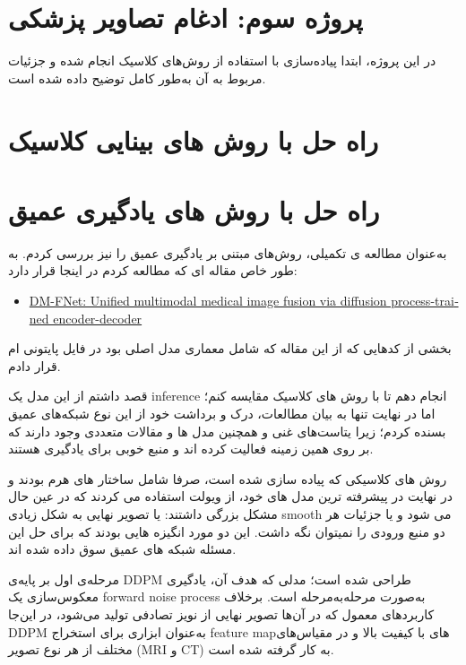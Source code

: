 \documentclass[a4paper,12pt]{article}
\begin{document}
\pagebreak


\section{پروژه سوم: ادغام تصاویر پزشکی}
در این پروژه، ابتدا پیاده‌سازی با استفاده از روش‌های کلاسیک انجام شده و جزئیات مربوط به آن به‌طور کامل توضیح داده شده است. 

\section*{راه حل با روش های بینایی کلاسیک}



\section*{راه حل با روش های یادگیری عمیق}

به‌عنوان مطالعه ی تکمیلی، روش‌های مبتنی بر یادگیری عمیق را نیز بررسی کردم. به طور خاص مقاله ای که مطالعه کردم در اینجا قرار دارد:

\begin{latin}
\begin{itemize}
\item \href{https://arxiv.org/html/2506.15218v1}{DM-FNet: Unified multimodal medical image fusion via diffusion process-trained encoder-decoder}
\end{itemize}
\end{latin}

بخشی از کدهایی که از این مقاله که شامل معماری مدل اصلی بود در فایل پایتونی ام قرار دادم.


 قصد داشتم از این مدل یک inference انجام دهم تا با روش های کلاسیک مقایسه کنم؛ اما در نهایت تنها به بیان مطالعات، درک و برداشت خود از این نوع شبکه‌های عمیق بسنده کردم؛ زیرا  یتاست‌های غنی و همچنین مدل‌ ها و مقالات متعددی وجود دارند که بر روی همین زمینه فعالیت کرده اند و منبع خوبی برای یادگیری هستند. 
 
 روش های کلاسیکی که پیاده سازی شده است، صرفا شامل ساختار های هرم بودند و در نهایت در پیشرفته ترین مدل های خود، از ویولت استفاده می کردند که در عین حال مشکل بزرگی داشتند:
 یا تصویر نهایی به شکل زیادی smooth می شود و یا جزئیات هر دو منبع ورودی را نمیتوان نگه داشت.
 این دو مورد انگیزه هایی بودند که برای حل این مسئله شبکه های عمیق سوق داده شده اند.
 
 
 مرحله‌ی اول بر پایه‌ی DDPM طراحی شده است؛ مدلی که هدف آن، یادگیری معکوس‌سازی یک forward noise process به‌صورت مرحله‌به‌مرحله است. برخلاف کاربردهای معمول که در آن‌ها تصویر نهایی از نویز تصادفی تولید می‌شود، در این‌جا DDPM به‌عنوان ابزاری برای استخراج feature map‌های با کیفیت بالا و در مقیاس‌های مختلف از هر نوع تصویر (MRI و CT) به کار گرفته شده است.
 
\end{document}
